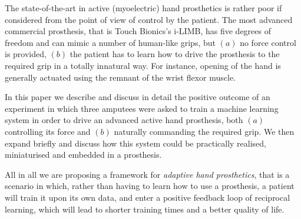 The state-of-the-art in active (myoelectric) hand prosthetics is
rather poor if considered from the point of view of control by the
patient. The most advanced commercial prosthesis, that is Touch
Bionics's i-LIMB, has five degrees of freedom and can mimic a number
of human-like grips, but $(a)$ no force control is provided, $(b)$ the
patient has to learn how to drive the prosthesis to the required grip
in a totally innatural way. For instance, opening of the hand is
generally actuated using the remnant of the wrist flexor muscle.

In this paper we describe and discuss in detail the positive outcome
of an experiment in which three amputees were asked to train a machine
learning system in order to drive an advanced active hand prosthesis,
both $(a)$ controlling its force and $(b)$ naturally commanding the
required grip. We then expand briefly and discuss how this system
could be practically realised, miniaturised and embedded in a
prosthesis.

All in all we are proposing a framework for \emph{adaptive hand
prosthetics}, that is a scenario in which, rather than having to learn
how to use a prosthesis, a patient will train it upon its own data,
and enter a positive feedback loop of reciprocal learning, which will
lead to shorter training times and a better quality of life.
